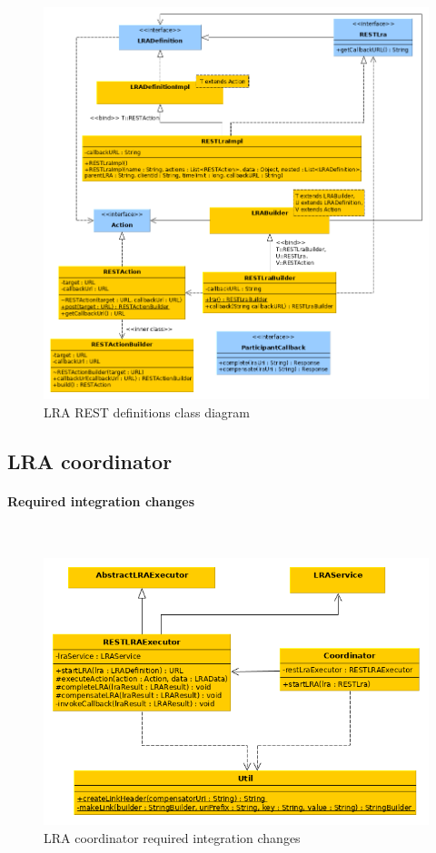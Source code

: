\documentclass[oneside,
  digital, %
  table,   %
  lof,     %
  lot,     %
]{fithesis3}
\newcommand{\newlinepar}[1]{\paragraph{#1}\needspace{3\baselineskip}\mbox{}\\}
\begin{document}
\begin{figure}[!h]
    \begin{center}
        \includegraphics[trim=3cm 0 0 0,height=0.8\textheight]{images/classDiagrams/lra-rest-definitions.png}
    \end{center}
    \caption{LRA REST definitions class diagram}
    \label{fig:lra-rest-definitions-class-diagram}
\end{figure}

\clearpage

\subsection{LRA coordinator}

\newlinepar{Required integration changes}

\hfill \break
\hfill \break
\hfill \break

\begin{figure}[!h]
    \begin{center}
        \includegraphics[trim=3cm 0 0 0,height=0.55\textheight]{images/classDiagrams/lra-coordinator.png}
    \end{center}
    \caption{LRA coordinator required integration changes}
    \label{fig:lra-coordinator-integration-class-diagram}
\end{figure}
\end{document}

